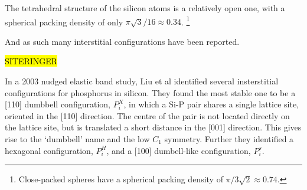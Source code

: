 \documentclass[11pt,bibliography=totoc,index=totoc]{scrbook}   %
\newcommand{\comment}[1]{\hl{#1}}
\begin{document}
The tetrahedral structure of the silicon atoms is a relatively open one, with a spherical packing density of only $\pi\sqrt{3}/16\approx 0.34$. \footnote{Close-packed spheres have a spherical packing density of $\pi/3\sqrt{2} \approx 0.74$.}

And as such many interstitial configurations have been reported.

\comment{SITERINGER}

In a 2003 nudged elastic band study, Liu et al identified several insterstitial configurations for phosphorus in silicon.
They found the most stable one to be a [110] dumbbell configuration, $P_i^X$, in which a Si-P pair shares a single lattice site, oriented in the [110] direction. The centre of the pair is not located directly on the lattice site, but is translated a short distance in the [001] direction. This gives rise to the `dumbbell' name and the low $C_1$ symmetry.
Further they identified a hexagonal configuration, $P_i^H$, and a [100] dumbell-like configuration, $P_i^s$.

\end{document}
